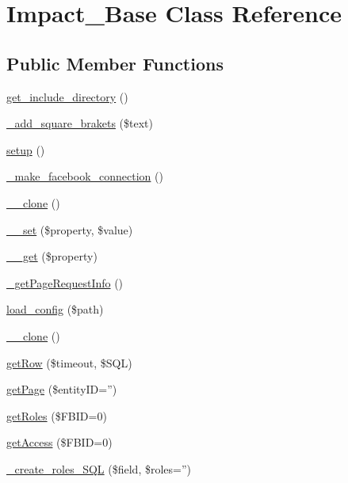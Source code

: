 \hypertarget{classImpact__Base}{
\section{Impact\_\-Base Class Reference}
\label{classImpact__Base}
}
\subsection*{Public Member Functions}
\begin{DoxyCompactItemize}
\item 
\hyperlink{classImpact__Base_ad0abe98dc00be95f647b055b6ad2ab49}{get\_\-include\_\-directory} ()
\item 
\hyperlink{classImpact__Base_a07992a5e5c1652992b241992ea8cd37c}{\_\-add\_\-square\_\-brakets} (\$text)
\item 
\hyperlink{classImpact__Base_a1d04139db3a5ad5713ecbd14d97da879}{setup} ()
\item 
\hyperlink{classImpact__Base_ab2e18c82d6909c852402b07aa48340bc}{\_\-make\_\-facebook\_\-connection} ()
\item 
\hyperlink{classImpact__Base_ad0cb87b388bc74d63dc884accdca8713}{\_\-\_\-clone} ()
\item 
\hyperlink{classImpact__Base_a9b7f2b58fa3c9e81f142efb424433163}{\_\-\_\-set} (\$property, \$value)
\item 
\hyperlink{classImpact__Base_a6481e8cfc93c80885b3d72a6e1f15a1f}{\_\-\_\-get} (\$property)
\item 
\hyperlink{classImpact__Base_a17d34c36f889ed7235dc17000bc34a93}{\_\-getPageRequestInfo} ()
\item 
\hyperlink{classImpact__Base_aa0142dba3a229260d22d37308f9544f7}{load\_\-config} (\$path)
\item 
\hyperlink{classImpact__Base_ad0cb87b388bc74d63dc884accdca8713}{\_\-\_\-clone} ()
\item 
\hyperlink{classImpact__Base_a9945c96006a5b6b0f7a9616bc583699e}{getRow} (\$timeout, \$SQL)
\item 
\hyperlink{classImpact__Base_a1298c8e04eb0b7ee14c83f943057c5f9}{getPage} (\$entityID='')
\item 
\hyperlink{classImpact__Base_aca5aa43c8f7299f34139634dd1813556}{getRoles} (\$FBID=0)
\item 
\hyperlink{classImpact__Base_a797fe24addf6c8900aeb9eb15aff8c72}{getAccess} (\$FBID=0)
\item 
\hyperlink{classImpact__Base_ac9be16a907db4f8122071242957efd5e}{\_\-create\_\-roles\_\-SQL} (\$field, \$roles='')
\end{DoxyCompactItemize}
